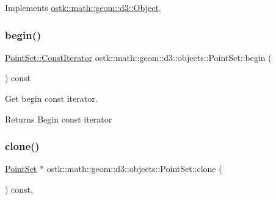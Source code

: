 Implements \hyperlink{classostk_1_1math_1_1geom_1_1d3_1_1_object_ae9194dd6d2bb4df09292ffc84dccdb1d}{ostk\+::math\+::geom\+::d3\+::\+Object}.

\mbox{\label{classostk_1_1math_1_1geom_1_1d3_1_1objects_1_1_point_set_ab660f9c1ab7ec392dce305a0d6cf72a5}} 
\subsubsection{\texorpdfstring{begin()}{begin()}}
{\footnotesize\ttfamily \hyperlink{classostk_1_1math_1_1geom_1_1d3_1_1objects_1_1_point_set_aa87eb9a571cb8b420e8c404005a2b723}{Point\+Set\+::\+Const\+Iterator} ostk\+::math\+::geom\+::d3\+::objects\+::\+Point\+Set\+::begin (\begin{DoxyParamCaption}{ }\end{DoxyParamCaption}) const}



Get begin const iterator. 

\begin{DoxyReturn}{Returns}
Begin const iterator 
\end{DoxyReturn}
\mbox{\label{classostk_1_1math_1_1geom_1_1d3_1_1objects_1_1_point_set_a5936e0dbba4443f938d074c5e77fdac7}} 
\subsubsection{\texorpdfstring{clone()}{clone()}}
{\footnotesize\ttfamily \hyperlink{classostk_1_1math_1_1geom_1_1d3_1_1objects_1_1_point_set}{Point\+Set} $\ast$ ostk\+::math\+::geom\+::d3\+::objects\+::\+Point\+Set\+::clone (\begin{DoxyParamCaption}{ }\end{DoxyParamCaption}) const\hspace{0.3cm}{\ttfamily [override]}, {\ttfamily [virtual]}}



